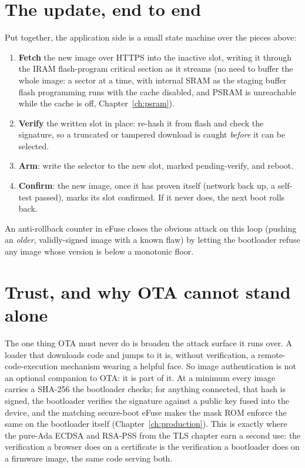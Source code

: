 \section{The update, end to end}

Put together, the application side is a small state machine over the pieces above:

\begin{enumerate}
\item \textbf{Fetch} the new image over HTTPS into the inactive slot, writing it
  through the IRAM flash-program critical section as it streams (no need to buffer
  the whole image: a sector at a time, with internal SRAM as the staging
  buffer \textemdash{} flash programming runs with the cache disabled, and
  PSRAM is unreachable while the cache is off, Chapter~\ref{ch:psram}).
\item \textbf{Verify} the written slot in place: re-hash it from flash and check the
  signature, so a truncated or tampered download is caught \emph{before} it can be
  selected.
\item \textbf{Arm}: write the selector to the new slot, marked pending-verify, and
  reboot.
\item \textbf{Confirm}: the new image, once it has proven itself (network back up, a
  self-test passed), marks its slot confirmed. If it never does, the next boot
  rolls back.
\end{enumerate}

An anti-rollback counter in eFuse closes the obvious attack on this loop (pushing
an \emph{older}, validly-signed image with a known flaw) by letting the bootloader
refuse any image whose version is below a monotonic floor.

\section{Trust, and why OTA cannot stand alone}\label{ota:trust}

The one thing OTA must never do is broaden the attack surface it runs over. A loader
that downloads code and jumps to it is, without verification, a remote-code-execution
mechanism wearing a helpful face. So image authentication is not an optional
companion to OTA: it is part of it. At a minimum every image carries a SHA-256 the
bootloader checks; for anything connected, that hash is signed, the bootloader
verifies the signature against a public key fused into the device, and the matching
secure-boot eFuse makes the mask ROM enforce the same on the bootloader itself
(Chapter~\ref{ch:production}). This is exactly where the pure-Ada ECDSA and RSA-PSS
from the TLS chapter earn a second use: the verification a browser does on a
certificate is the verification a bootloader does on a firmware image, the same code
serving both.

